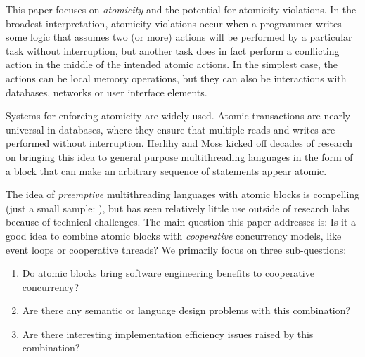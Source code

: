 \documentclass[acmsmall,anonymous,review]{acmart}\settopmatter{printfolios=true,printccs=false,printacmref=false}
\begin{document}

This paper focuses on \emph{atomicity} and the potential for atomicity violations.
In the broadest interpretation, atomicity violations occur when a programmer writes some logic that assumes two (or more) actions will be performed by a particular task without interruption, but another task does in fact perform a conflicting action in the middle of the intended atomic actions.
In the simplest case, the actions can be local memory operations, but they can also be interactions with databases, networks or user interface elements.

Systems for enforcing atomicity are widely used.
Atomic transactions are nearly universal in databases, where they ensure that multiple reads and writes are performed without interruption.
Herlihy and Moss \cite{Herlihy1993} kicked off decades of research on bringing this idea to general purpose multithreading languages in the form of a block that can make an arbitrary sequence of statements appear atomic.



The idea of \emph{preemptive} multithreading languages with atomic blocks is compelling (just a small sample: \cite{Harris2003, Harris2005, Ringenburg2005, Herlihy2006, Ni2008}), but has seen relatively little use outside of research labs because of technical challenges.
The main question this paper addresses is: Is it a good idea to combine atomic blocks with \emph{cooperative} concurrency models, like event loops or cooperative threads?
We primarily focus on three sub-questions:
\begin{enumerate}
\item Do atomic blocks bring software engineering benefits to cooperative concurrency?
\item Are there any semantic or language design problems with this combination?
\item Are there interesting implementation efficiency issues raised by this combination?
\end{enumerate}
\end{document}
